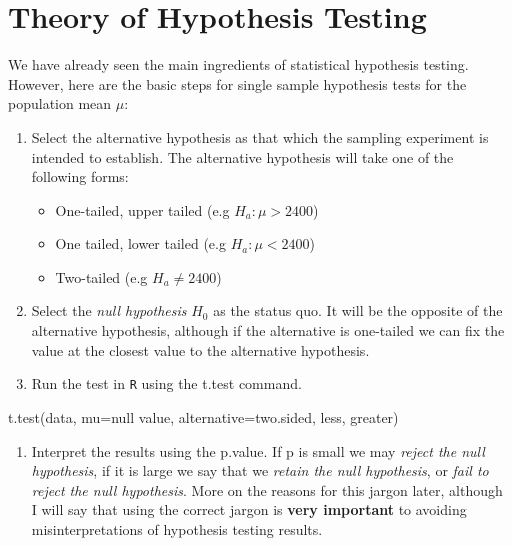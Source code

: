 \documentclass[
]{book}
\newenvironment{Shaded}{\begin{snugshade}}{\end{snugshade}}
\newcommand{\AttributeTok}[1]{\textcolor[rgb]{0.77,0.63,0.00}{#1}}
\newcommand{\FunctionTok}[1]{\textcolor[rgb]{0.00,0.00,0.00}{#1}}
\newcommand{\NormalTok}[1]{#1}
\providecommand{\tightlist}{%
  \setlength{\itemsep}{0pt}\setlength{\parskip}{0pt}}
\theoremstyle{definition}
\theoremstyle{definition}
\theoremstyle{definition}
\theoremstyle{definition}
\theoremstyle{remark}
\begin{document}
\hypertarget{theory-of-hypothesis-testing}{%
\section{Theory of Hypothesis Testing}\label{theory-of-hypothesis-testing}}

We have already seen the main ingredients of statistical hypothesis testing. However, here are the basic steps for single sample hypothesis tests for the population mean \(\mu\):

\begin{enumerate}
\def\labelenumi{\arabic{enumi}.}
\item
  Select the alternative hypothesis as that which the sampling experiment is intended to establish. The alternative hypothesis will take one of the following forms:

  \begin{itemize}
  \tightlist
  \item
    One-tailed, upper tailed (e.g \(H_a: \mu > 2400\))
  \item
    One tailed, lower tailed (e.g \(H_a: \mu < 2400\))
  \item
    Two-tailed (e.g \(H_a \neq 2400\))
  \end{itemize}
\item
  Select the \emph{null hypothesis} \(H_0\) as the status quo. It will be the opposite of the alternative hypothesis, although if the alternative is one-tailed we can fix the value at the closest value to the alternative hypothesis.
\item
  Run the test in \texttt{R} using the t.test command.
\end{enumerate}

\begin{Shaded}
\begin{Highlighting}[]
\FunctionTok{t.test}\NormalTok{(data, }\AttributeTok{mu=}\NormalTok{null value, }\AttributeTok{alternative=}\NormalTok{two.sided, less, greater)}
\end{Highlighting}
\end{Shaded}

\begin{enumerate}
\def\labelenumi{\arabic{enumi}.}
\setcounter{enumi}{3}
\tightlist
\item
  Interpret the results using the p.value. If p is small we may \emph{reject the null hypothesis}, if it is large we say that we \emph{retain the null hypothesis}, or \emph{fail to reject the null hypothesis}. More on the reasons for this jargon later, although I will say that using the correct jargon is \textbf{very important} to avoiding misinterpretations of hypothesis testing results.
\end{enumerate}
\end{document}
